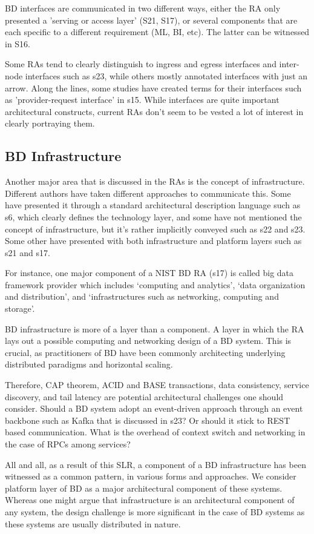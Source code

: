 \documentclass[review]{elsarticle}
\begin{document}
BD interfaces are communicated in two different ways, either the RA only presented a 'serving or access layer' (S21, S17), or several components that are each specific to a different requirement (ML, BI, etc). The latter can be witnessed in S16.

Some RAs tend to clearly distinguish to ingress and egress interfaces and inter-node interfaces such as s23, while others mostly annotated interfaces with just an arrow. Along the lines, some studies have created terms for their interfaces such as 'provider-request interface' in s15. While interfaces are quite important architectural constructs, current RAs don't seem to be vested a lot of interest in clearly portraying them. 

\subsection{BD Infrastructure}

Another major area that is discussed in the RAs is the concept of infrastructure. Different authors have taken different approaches to communicate this. Some have presented it through a standard architectural description language such as s6, which clearly defines the technology layer, and some have not mentioned the concept of infrastructure, but it's rather implicitly conveyed such as s22 and s23. Some other have presented with both infrastructure and platform layers such as s21 and s17. 

For instance, one major component of a NIST BD RA (s17) is called big data framework provider which includes ‘computing and analytics’, ‘data organization and distribution’, and ‘infrastructures such as networking, computing and storage’.  

 BD infrastructure is more of a layer than a component. A layer in which the RA lays out a possible computing and networking design of a BD system. This is crucial, as practitioners of BD have been commonly architecting underlying distributed paradigms and horizontal scaling. 

Therefore, CAP theorem, ACID and BASE transactions, data consistency, service discovery, and tail latency are potential architectural challenges one should consider. Should a BD system adopt an event-driven approach through an event backbone such as Kafka that is discussed in s23? Or should it stick to REST based communication. What is the overhead of context switch and networking in the case of RPCs among services?  

All and all, as a result of this SLR, a component of a BD infrastructure has been witnessed as a common pattern, in various forms and approaches. We consider platform layer of BD as a major architectural component of these systems. Whereas one might argue that infrastructure is an architectural component of any system, the design challenge is more significant in the case of BD systems as these systems are usually distributed in nature.
\end{document}
